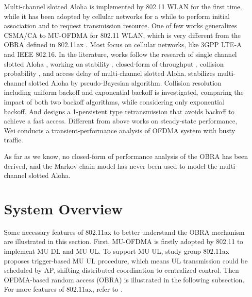 \documentclass[journal]{IEEEtran}
\begin{document}
Multi-channel slotted Aloha is implemented by 802.11 WLAN for the first time, while it has been adopted by cellular networks for a while to perform initial association and to request transmission resource.
One of few works \cite{GeneralizedOFDMACSMACA} generalizes CSMA/CA to MU-OFDMA for 802.11 WLAN, which is very different from the OBRA defined in 802.11ax \cite{draft_ax}. 
Most focus on cellular networks, like 3GPP LTE-A and IEEE 802.16.
In the literature, works follow the research of single channel slotted Aloha \cite{roberts1975aloha}, working on stability \cite{shen2003performance}, closed-form of throughput \cite{zhou2008efficient}\cite{shen2003performance}\cite{choi2006multichannel}, collision probability \cite{kim2012performance}\cite{seo2011design}, and access delay \cite{zhou2008efficient}\cite{kim2012performance}\cite{seo2011design} of multi-channel slotted Aloha.
\cite{shen2003performance} stabilizes multi-channel slotted Aloha by pseudo-Bayesian algorithm.
Collision resolution including uniform backoff and exponential backoff is investigated, \cite{zhou2008efficient}\cite{seo2011design} comparing the impact of both two backoff algorithms, while \cite{kim2012performance} considering only exponential backoff.
And \cite{choi2006multichannel} designs a 1-persistent type retransmission that avoids backoff to achieve a fast access.
Different from above works on steady-state performance, Wei \cite{wei2012modeling}\cite{wei2015modeling} conducts a transient-performance analysis of OFDMA system with busty traffic.

As far as we know, no closed-form of performance analysis of the OBRA has been derived, and the Markov chain model has never been used to model the multi-channel slotted Aloha.

\section{System Overview}			\label{sec_ax_feature}
Some necessary features of 802.11ax to better understand the OBRA mechanism are illustrated in this section.
First, MU-OFDMA is firstly adopted by 802.11 to implement MU DL and MU UL. 
To support MU UL, study group 802.11ax proposes trigger-based MU UL procedure, which means UL transmission could be scheduled by AP, shifting distributed coordination to centralized control.
Then OFDMA-based random access (OBRA) is illustrated in the following subsection.
For more features of 802.11ax, refer to \cite{draft_ax}\cite{dengquality}.
\end{document}
